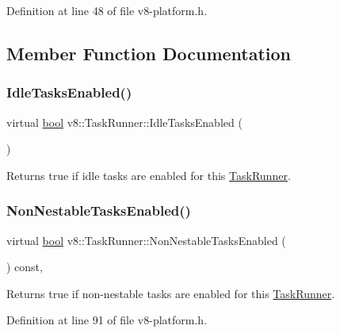 Definition at line 48 of file v8-\/platform.\+h.



\subsection{Member Function Documentation}
\mbox{\label{classv8_1_1TaskRunner_aa8a6077bed5735e2190918685faf20f5}} 
\subsubsection{\texorpdfstring{Idle\+Tasks\+Enabled()}{IdleTasksEnabled()}}
{\footnotesize\ttfamily virtual \mbox{\hyperlink{classbool}{bool}} v8\+::\+Task\+Runner\+::\+Idle\+Tasks\+Enabled (\begin{DoxyParamCaption}{ }\end{DoxyParamCaption})\hspace{0.3cm}{\ttfamily [pure virtual]}}

Returns true if idle tasks are enabled for this \mbox{\hyperlink{classv8_1_1TaskRunner}{Task\+Runner}}. \mbox{\label{classv8_1_1TaskRunner_a7042a9967ddaaf1f995e568c3dd7ce64}} 
\subsubsection{\texorpdfstring{Non\+Nestable\+Tasks\+Enabled()}{NonNestableTasksEnabled()}}
{\footnotesize\ttfamily virtual \mbox{\hyperlink{classbool}{bool}} v8\+::\+Task\+Runner\+::\+Non\+Nestable\+Tasks\+Enabled (\begin{DoxyParamCaption}{ }\end{DoxyParamCaption}) const\hspace{0.3cm}{\ttfamily [inline]}, {\ttfamily [virtual]}}

Returns true if non-\/nestable tasks are enabled for this \mbox{\hyperlink{classv8_1_1TaskRunner}{Task\+Runner}}. 

Definition at line 91 of file v8-\/platform.\+h.

